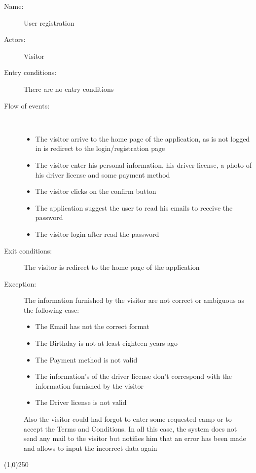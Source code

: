 \begin{description}
	\item[Name:] User registration
	\item[Actors:] Visitor
	\item[Entry conditions:] There are no entry conditions
	\item[Flow of events:]  \ \\
		\begin{itemize}
			\item The visitor arrive to the home page of the application, as is not logged in is redirect to the login/registration page
			\item The visitor enter his personal information, his driver license, a photo of his driver license and some payment method
			\item The visitor clicks on the confirm button
			\item The application suggest the user to read his emails to receive the password
			\item The visitor login after read the password
		\end{itemize}
	\item[Exit conditions:] The visitor is redirect to the home page of the application
	\item [Exception:] The information furnished by the visitor are not correct or ambiguous as the following case:
		\begin{itemize}
			\item The Email has not the correct format
			\item The Birthday is not at least eighteen years ago
			\item The Payment method is not valid
			\item The information's of the driver license don't correspond with the information furnished by the visitor
			\item The Driver license is not valid
		\end {itemize}
		Also the visitor could had forgot to enter some requested camp or to accept the Terms and Conditions. In all this case, the system does not send any mail to the visitor but notifies him that an error has been made and allows to input the incorrect data again
	\end{description}
	
\begin{center}
\line(1,0){250}
\end{center}

